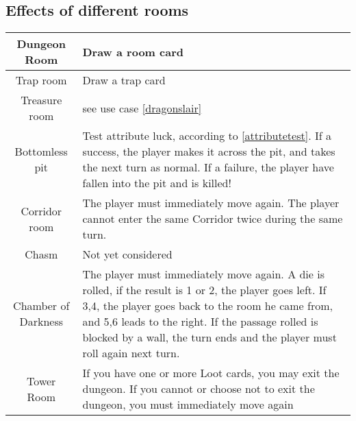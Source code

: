 \subsection{Effects of different rooms}
\label{roomeffects}
\begin{tabular}{|c| p{9cm} |}
\hline
Dungeon Room & Draw a room card \\\hline
Trap room & Draw a trap card \\\hline
Treasure room & see use case \ref{dragonslair} \\\hline
Bottomless pit & Test attribute luck, according to \ref{attributetest}. If a success, the player makes it across the pit, and takes the next turn as normal. If a failure, the player have fallen into the pit and is killed! \\\hline
Corridor room & The player must immediately move again. The player cannot enter the same Corridor twice during the same turn.\\\hline
Chasm & Not yet considered \\ \hline
Chamber of Darkness & The player must immediately move again. A die is rolled, if the result is 1 or 2, the player goes left. If 3,4, the player goes back to the room he came from, and 5,6 leads to the right. If the passage rolled is blocked by a wall, the turn ends and the player must roll again next turn.\\\hline
Tower Room & If you have one or more Loot cards, you may exit the dungeon. If you cannot or choose not to exit the dungeon, you must immediately move again \\

\hline
\end{tabular}

\newpage
